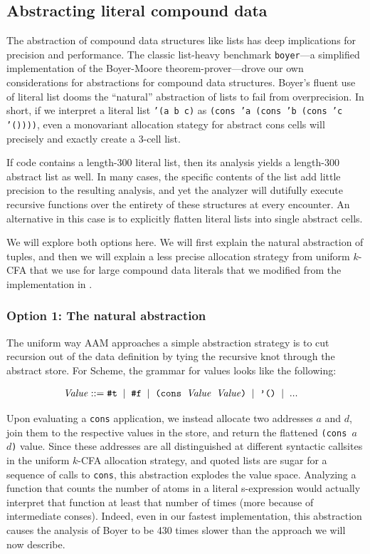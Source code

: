 \documentclass[preprint,onecolumn,9pt]{sigplanconf} %
\begin{document}
\subsection{Abstracting literal compound data}

The abstraction of compound data structures like lists has deep implications 
for precision and performance.
%
The classic list-heavy benchmark {\tt boyer}---a simplified implementation
of the Boyer-Moore theorem-prover---drove our own considerations for
abstractions for compound data structures.
%
Boyer's fluent use of literal list dooms the ``natural'' abstraction
of lists to fail from overprecision.
%
In short, if we interpret a literal list {\tt '(a b c)} as {\tt (cons 'a (cons 'b
(cons 'c '())))}, even a monovariant allocation stategy for abstract
cons cells will precisely and exactly create a 3-cell list.

If code contains a length-300 literal list, then its analysis yields a length-300 abstract
list as well.
%
In many cases, the specific contents of the list add little precision
to the resulting analysis, and yet the analyzer will dutifully execute
recursive functions over the entirety of these structures at every
encounter.
%
An alternative in this case is to explicitly flatten literal lists
into single abstract cells.

We will explore both options here.
%
We will first explain the natural abstraction of tuples, and then we
will explain a less precise allocation strategy from uniform $k$-CFA
that we use for large compound data literals that we modified from the
implementation in \citep{dvanhorn:wright-jagannathan-toplas98}.

\subsubsection{Option 1: The natural abstraction}

The uniform way AAM approaches a simple abstraction strategy is to cut
recursion out of the data definition by tying the recursive knot
through the abstract store. For Scheme, the grammar for values looks
like the following:

\newcommand{\alt}{\;\mid\;}
\begin{align*}
\Value &::= \mbox{{\tt \#t}} \alt \mbox{{\tt \#f}} \alt \mbox{{\tt(cons $\Value$ $\Value$)}} \alt \mbox{{\tt '()}} \alt ...
\end{align*}

Upon evaluating a {\tt cons} application, we instead allocate two
addresses $a$ and $d$, join them to the respective values in the
store, and return the flattened {\tt (cons $a$ $d$)} value. Since
these addresses are all distinguished at different syntactic callsites
in the uniform $k$-CFA allocation strategy, and quoted lists are sugar
for a sequence of calls to {\tt cons}, this abstraction explodes the
value space. Analyzing a function that counts the number of atoms in a
literal s-expression would actually interpret that function at least
that number of times (more because of intermediate conses). Indeed,
even in our fastest implementation, this abstraction causes the
analysis of Boyer to be 430 times slower than the approach we will now
describe.
\end{document}
